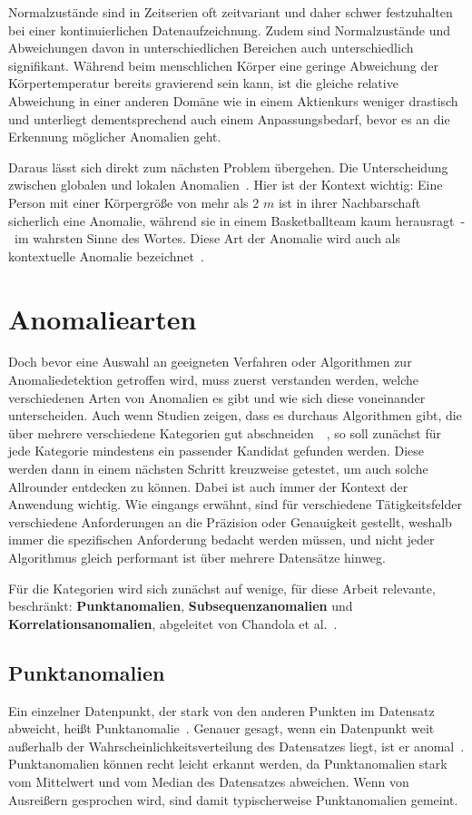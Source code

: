 Normalzustände sind in Zeitserien oft zeitvariant und daher schwer festzuhalten bei einer kontinuierlichen Datenaufzeichnung.
Zudem sind Normalzustände und Abweichungen davon in unterschiedlichen Bereichen auch unterschiedlich signifikant. Während beim
menschlichen Körper eine geringe Abweichung der Körpertemperatur bereits gravierend sein kann, ist die gleiche relative Abweichung
in einer anderen Domäne wie in einem Aktienkurs weniger drastisch und unterliegt dementsprechend auch einem Anpassungsbedarf, bevor
es an die Erkennung möglicher Anomalien geht.

Daraus lässt sich direkt zum nächsten Problem übergehen. Die Unterscheidung zwischen globalen und lokalen Anomalien~\cite{Breunig2000}.
Hier ist der Kontext wichtig: Eine Person mit einer Körpergröße von mehr als 2 $m$ ist in ihrer Nachbarschaft sicherlich eine Anomalie,
während sie in einem Basketballteam kaum herausragt~-~im wahrsten Sinne des Wortes. Diese Art der Anomalie wird auch als kontextuelle
Anomalie bezeichnet~\Cite[S.~12]{Wenig2024}.

\section{Anomaliearten}
Doch bevor eine Auswahl an geeigneten Verfahren oder Algorithmen zur Anomaliedetektion getroffen wird, muss zuerst verstanden werden,
welche verschiedenen Arten von Anomalien es gibt und wie sich diese voneinander unterscheiden.
Auch wenn Studien zeigen, dass es durchaus Algorithmen gibt, die über mehrere verschiedene Kategorien gut
abschneiden~\cite[S.~30~-~31]{Wenig2024}~\cite{Schmidl2022}, so soll zunächst für jede Kategorie mindestens ein passender Kandidat
gefunden werden. Diese werden dann in einem nächsten Schritt kreuzweise getestet, um auch solche Allrounder entdecken zu können. Dabei
ist auch immer der Kontext der Anwendung wichtig. Wie eingangs erwähnt, sind für verschiedene Tätigkeitsfelder verschiedene
Anforderungen an die Präzision oder Genauigkeit gestellt, weshalb immer die spezifischen Anforderung bedacht werden müssen, und nicht
jeder Algorithmus gleich performant ist über mehrere Datensätze hinweg.

Für die Kategorien wird sich zunächst auf wenige, für diese Arbeit relevante, beschränkt: \textbf{Punkt\-anomalien},
\textbf{Subsequenzanomalien} und \textbf{Korrelationsanomalien}, abgeleitet von Chandola et al.~\cite{Chandola2009}.

\subsection{Punktanomalien}
Ein einzelner Datenpunkt, der stark von den anderen Punkten im Datensatz abweicht, heißt Punkt\-anomalie~\cite{Chandola2009}. Genauer
gesagt, wenn ein Datenpunkt weit außerhalb der Wahrscheinlichkeitsverteilung des Datensatzes liegt, ist er anomal~\Cite[Kap.~10]{Tan2014}.
Punktanomalien können recht leicht erkannt werden, da Punktanomalien stark vom Mittelwert und vom Median des Datensatzes abweichen. Wenn
von Ausreißern gesprochen wird, sind damit typischerweise Punktanomalien gemeint.

